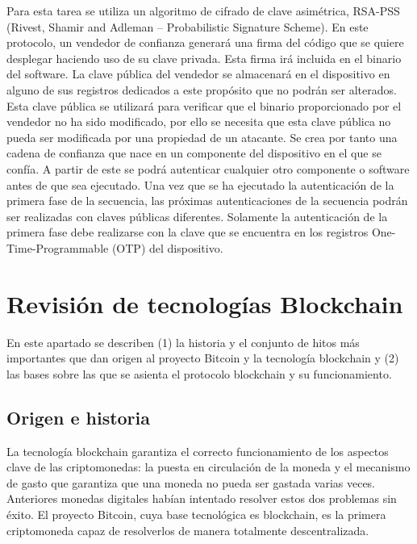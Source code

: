Para esta tarea se utiliza un algoritmo de cifrado de clave asimétrica, RSA-PSS (Rivest, Shamir and Adleman – Probabilistic Signature Scheme). En este protocolo, un vendedor de confianza generará una firma del código que se quiere desplegar haciendo uso de su clave privada. Esta firma irá incluida en el binario del software. La clave pública del vendedor se almacenará en el dispositivo en alguno de sus registros dedicados a este propósito que no podrán ser alterados. Esta clave pública se utilizará para verificar que el binario proporcionado por el vendedor no ha sido modificado, por ello se necesita que esta clave pública no pueda ser modificada por una propiedad de un atacante.
Se crea por tanto una cadena de confianza que nace en un componente del dispositivo en el que se confía. A partir de este se podrá autenticar cualquier otro componente o software antes de que sea ejecutado. Una vez que se ha ejecutado la autenticación de la primera fase de la secuencia, las próximas autenticaciones de la secuencia podrán ser realizadas con claves públicas diferentes. Solamente la autenticación de la primera fase debe realizarse con la clave que se encuentra en los registros One-Time-Programmable (OTP) del dispositivo.










\section{Revisión de tecnologías Blockchain}
En este apartado se describen (1) la historia y el conjunto de hitos más importantes que dan origen al proyecto Bitcoin y la tecnología blockchain y (2) las bases sobre las que se asienta el protocolo blockchain y su funcionamiento.

\subsection{Origen e historia}
La tecnología blockchain garantiza el correcto funcionamiento de los aspectos clave de las criptomonedas: la puesta en circulación de la moneda y el mecanismo de gasto que garantiza que una moneda no pueda ser gastada varias veces. Anteriores monedas digitales habían intentado resolver estos dos problemas sin éxito. El proyecto Bitcoin, cuya base tecnológica es blockchain, es la primera criptomoneda capaz de resolverlos de manera totalmente descentralizada. \newline

